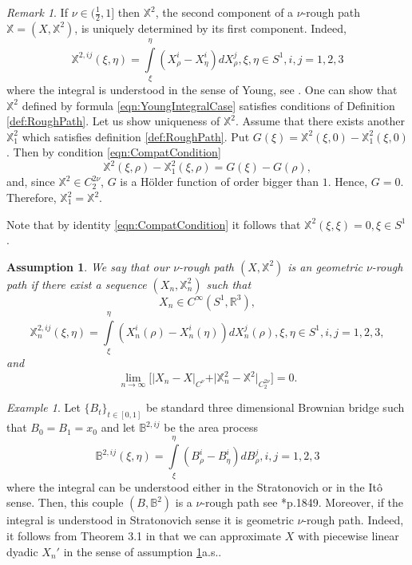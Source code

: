 \documentclass[11pt,a4paper,leqno]{amsart}%
\theoremstyle{plain}
\theoremstyle{remark}
\newtheorem{remark}[theorem]{Remark}
\newtheorem{example}[theorem]{Example}
\theoremstyle{plain}
\newtheorem{assumption}[theorem]{Assumption}
\numberwithin{equation}{section}
\def\Rnu{{\mathbb R}}
\def\intl{\int\limits}
\begin{document}
\begin{remark}
If $\nu\in(\frac{1}{2},1]$ then $\mathbb{X}^2$, the second
component of a $\nu$-rough path $\mathbb{X}=(X,\mathbb{X}^2)$, is
uniquely determined by its first component. Indeed,
\begin{equation}
\mathbb{X}^{2,ij}(\xi,\eta)=\intl_{\xi}^{\eta}(X^i_{\rho}-X^i_{\eta})dX^j_{\rho},\xi,\eta\in
S^1,i,j=1,2,3\label{eqn:YoungIntegralCase}
\end{equation}
where the integral is understood in the sense of Young, see
\cite{[Young-1936]}. One can show that $\mathbb{X}^{2}$ defined by
formula \eqref{eqn:YoungIntegralCase} satisfies conditions of
Definition \ref{def:RoughPath}. Let us show uniqueness of
$\mathbb{X}^{2}$. Assume that there exists another
$\mathbb{X}_1^{2}$ which satisfies definition \ref{def:RoughPath}.
Put $G(\xi)=\mathbb{X}^{2}(\xi,0)-\mathbb{X}_1^{2}(\xi,0)$. Then
by condition \ref{eqn:CompatCondition}
$$
\mathbb{X}^{2}(\xi,\rho)-\mathbb{X}_1^{2}(\xi,\rho)=G(\xi)-G(\rho),
$$
and, since $\mathbb{X}^{2}\in C_2^{2\nu}$, $G$ is a H\"{o}lder
function of order bigger  than $1$. Hence,  $G=0$. Therefore,
$\mathbb{X}_1^{2}=\mathbb{X}^{2}$.
\end{remark}
Note that by identity \eqref{eqn:CompatCondition} it follows that
$\mathbb{X}^2(\xi,\xi)=0,\xi\in S^1$.
\begin{assumption}\label{ass:RoughPathApproximability}
We say that our $\nu$-rough path $(X,\mathbb{X}^2)$  is an
geometric $\nu$-rough path if there exist a sequence
$(X_n,\mathbb{X}_n^2)$ such that
$$
X_n\in C^{\infty}(S^1,\Rnu^3),
$$
$$
\mathbb{X}_n^{2,ij}(\xi,\eta)=\intl_{\xi}^{\eta}(X_n^i({\rho})-X_n^i({\eta}))dX_n^j({\rho}),\xi,\eta\in
S^1,i,j=1,2,3,
$$
and
\begin{equation}
\lim_{n\to\infty}\big[\vert X_n-X\vert_{C^{\nu}}+\vert \mathbb{X}_n^2-\mathbb{X}^2\vert_{C_2^{2\nu}}\big]=
0.\label{eqn:RoughPathTopology}
\end{equation}
\end{assumption}
\begin{example}
Let $\{B_t\}_{t\in [0,1]}$ be standard three dimensional Brownian
bridge such that $B_0=B_1=x_0$ and let $\mathbb{B}^{2,ij}$ be the
area process
$$
\mathbb{B}^{2,ij}(\xi,\eta)=\intl_{\xi}^{\eta}(B^i_{\rho}-B^i_{\eta})dB^j_{\rho},i,j=1,2,3
$$
where the integral can be understood either in the Stratonovich or in the It\^o
sense. Then, this couple $(B,\mathbb{B}^2)$ is a $\nu$-rough path see \cite{[Bess+Gub_2005]}*{p.1849}. Moreover, if the integral is understood in Stratonovich sense it is
geometric $\nu$-rough path.  Indeed, it follows from Theorem
3.1 in \cite{[Friz-2005]} that we can approximate $X$ with
piecewise linear dyadic $X_n'$ in the sense of assumption
\ref{ass:RoughPathApproximability}a.s..
\end{example}
\end{document}
